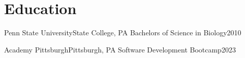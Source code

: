 
\section{Education}
\resumeSubHeadingListStart
  \resumeSubheading
    {Penn State University}{State College, PA}
    {Bachelors of Science in Biology}{2010}

  \resumeSubheading
    {Academy Pittsburgh}{Pittsburgh, PA}
    {Software Development Bootcamp}{2023}
\resumeSubHeadingListEnd